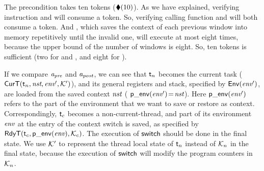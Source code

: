 The precondition takes ten tokens ($\blacklozenge({10})$). 
As we have explained, verifying instruction \call{} 
and \jmp{} will consume a token. 
So, verifying calling function
\regsave{} and \regrestore{} will 
both consume a token. And \SaveUsedWin{}, 
which saves the context of each previous window 
into memory repetitively until the invalid one,  
will execute at most eight times, 
because the upper bound of 
the number of windows is eight. 
So, ten tokens is sufficient (two for \regsave{} and 
\regrestore{}, and eight for \SaveUsedWin{}). 

If we compare $\textit{a}_\textit{pre}$ and $\textit{a}_\textit{post}$, we can see that
$\textsf{t}_n$ becomes the current task
($\textsf{CurT}({\textsf{t}_n}, {\textit{nst}}, {\textit{env}'}, {\mathcal{K}'})$),
and its general registers and stack, specified by
$\mathsf{Env}({\textit{env}'})$, are loaded from the saved context
$\textit{nst}$ (\ie{} $\mathsf{p\_env}({\textit{env}'})\!=\!\textit{nst}$).
Here $\mathsf{p\_env}({\textit{env}'})$ refers to the part of the environment
that we want to save or restore as context.
Correspondingly, $\textsf{t}_c$ becomes a non-current-thread,
and part of its environment $\textit{env}$ at the entry of
the context switch is saved, as specified by
$\textsf{RdyT}({\textsf{t}_c}, {\mathsf{p\_env}({\textit{env}})}, {\mathcal{K}_c})$. 
The execution of $\mathsf{switch}$ should be done in the final state. 
We use $\mathcal{K}'$ to represent the thread local 
state of $\textsf{t}_n$ instead of $\mathcal{K}_n$ 
in the final state, because the execution of 
$\mathsf{switch}$ will modify the program counters 
in $\mathcal{K}_n$. 


